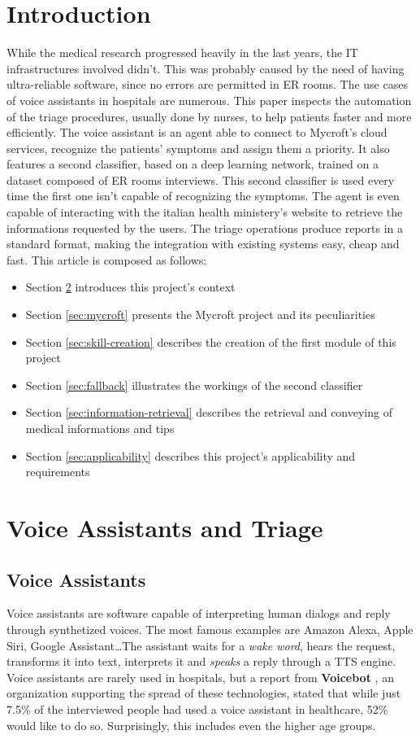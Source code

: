\documentclass[conference]{IEEEtran}
\begin{document}
\section{Introduction}
While the medical research progressed heavily in the last years, the IT infrastructures involved didn't. This was probably caused by the need of having ultra-reliable software, since no errors are permitted in ER rooms. The use cases of voice assistants in hospitals are numerous. This paper inspects the automation of the triage procedures, usually done by nurses, to help patients faster and more efficiently. The voice assistant is an agent able to connect to Mycroft's cloud services, recognize the patients' symptoms and assign them a priority. It also features a second classifier, based on a deep learning network, trained on a dataset composed of ER rooms interviews. This second classifier is used every time the first one isn't capable of recognizing the symptoms. The agent is even capable of interacting with the italian health ministery's website to retrieve the informations requested by the users. The triage operations produce reports in a standard format, making the integration with existing systems easy, cheap and fast. This article is composed as follows:
\begin{itemize}
    \item Section \ref{sec:voice-assistants-and-triage} introduces this project's context
    \item Section \ref{sec:mycroft} presents the Mycroft project and its peculiarities
    \item Section \ref{sec:skill-creation} describes the creation of the first module of this project
    \item Section \ref{sec:fallback} illustrates the workings of the second classifier
    \item Section \ref{sec:information-retrieval} describes the retrieval and conveying of medical informations and tips
    \item Section \ref{sec:applicability} describes this project's applicability and requirements
\end{itemize}

\section{Voice Assistants and Triage}
\label{sec:voice-assistants-and-triage}
\subsection{Voice Assistants}
Voice assistants are software capable of interpreting human dialogs and reply through synthetized voices. The most famous examples are Amazon Alexa, Apple Siri, Google Assistant\dots The assistant waits for a \textit{wake word}, hears the request, transforms it into text, interprets it and \textit{speaks} a reply through a TTS engine. Voice assistants are rarely used in hospitals, but a report from \textbf{Voicebot} \cite{b1}, an organization supporting the spread of these technologies, stated that while just 7.5\% of the interviewed people had used a voice assistant in healthcare, 52\% would like to do so. Surprisingly, this includes even the higher age groups.
\end{document}
